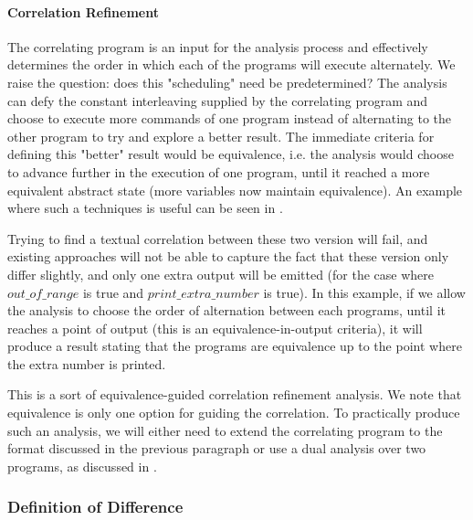 \paragraph{Correlation Refinement} The correlating program is an input for the analysis process and effectively determines the order in which each of the programs will execute alternately. We raise the question: does this "scheduling" need be predetermined? The analysis can defy the constant interleaving supplied by the correlating program and choose to execute more commands of one program instead of alternating to the other program to try and explore a better result. The immediate criteria for defining this "better" result would be equivalence, i.e. the analysis would choose to advance further in the execution of one program, until it reached a more equivalent abstract state (more variables now maintain equivalence). An example where such a techniques is useful can be seen in .



Trying to find a textual correlation between these two version will fail, and existing approaches will not be able to capture the fact that these version only differ slightly, and only one extra output will be emitted (for the case where $out\_of\_range$ is true and $print\_extra\_number$ is true). In this example, if we allow the analysis to choose the order of alternation between each programs, until it reaches a point of output (this is an equivalence-in-output criteria), it will produce a result stating that the programs are equivalence up to the point where the extra number is printed.

This is a sort of equivalence-guided correlation refinement analysis. We note that equivalence is only one option for guiding the correlation. To practically produce such an analysis, we will either need to extend the correlating program to the format discussed in the previous paragraph or use a dual analysis over two programs, as discussed in .

\subsubsection{Definition of Difference}

